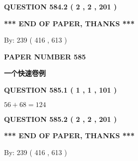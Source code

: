 \documentclass{ctexart}
\begin{document}
 
  
\vspace{0.2in}
  
{\textbf{\Large{QUESTION
584.2 
 ( 2 , 2 , 201 )
}}}
  
  
   
   
 \vspace{0.2in}
 
   
   
   
   
\vspace{1.0in} 
{\textbf{\large{ *** END OF PAPER, THANKS *** }}} 
   
   
\hspace{1.0in} By: 
 239 ( 416 ,  613 )
   
   
   
   
\newpage 
\setcounter{page}{ 
   585001 } 
   
   
   
   
 {\textbf{ \Large{ PAPER NUMBER  585  }}}
   
   
\vspace{0.2in}
   
   
   
   
   
   
 \vspace{0.2in}
{\LARGE {\textbf{ 一个快速卷例}}}
   
   
  
\vspace{0.2in}
  
{\textbf{\Large{QUESTION
585.1 
 ( 1 , 1 , 101 )
}}}
  
  
 
 

$ %
56 +  %
68=   %
124$
 
 
  
\vspace{0.2in}
  
{\textbf{\Large{QUESTION
585.2 
 ( 2 , 2 , 201 )
}}}
  
  
   
   
 \vspace{0.2in}
 
   
   
   
   
\vspace{1.0in} 
{\textbf{\large{ *** END OF PAPER, THANKS *** }}} 
   
   
\hspace{1.0in} By: 
 239 ( 416 ,  613 )
   
\end{document}

